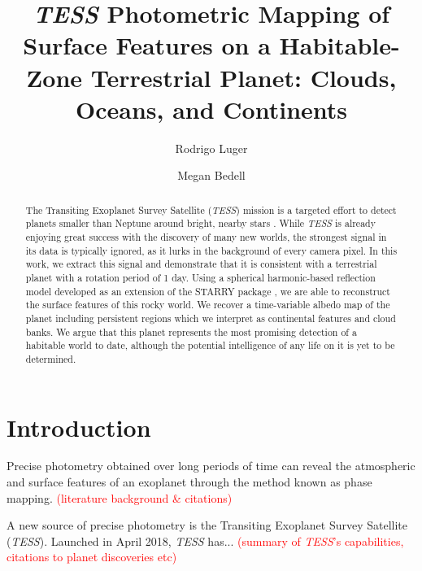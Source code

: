 \documentclass[modern]{aastex62}
\newcommand{\TESS}{\emph{TESS}\xspace}
\newcommand{\todo}[1]{\textcolor{red}{#1}}
\begin{document}
\title{\TESS Photometric Mapping of Surface Features on a Habitable-Zone Terrestrial Planet: Clouds, Oceans, and Continents}

\author[0000-0002-0296-3826]{Rodrigo Luger}
%
\author[0000-0002-9328-5652]{Megan Bedell}

\begin{abstract}
The Transiting Exoplanet Survey Satellite (\TESS) mission is a targeted effort to detect planets smaller than Neptune around bright, nearby stars \citep{Ricker2015}. 
While \TESS is already enjoying great success with the discovery of many new worlds, the strongest signal in its data is typically ignored, as it lurks in the background of every camera pixel. 
In this work, we extract this signal and demonstrate that it is consistent with a terrestrial planet with a rotation period of 1 day. 
Using a spherical harmonic-based reflection model developed as an extension of the STARRY package \citep{Luger2018}, we are able to reconstruct the surface features of this rocky world. 
We recover a time-variable albedo map of the planet including persistent regions which we interpret as continental features and cloud banks. 
We argue that this planet represents the most promising detection of a habitable world to date, although the potential intelligence of any life on it is yet to be determined.
\end{abstract}


\section{Introduction}
\label{sec:intro}

Precise photometry obtained over long periods of time can reveal the atmospheric and surface features of an exoplanet through the method known as phase mapping. \todo{(literature background \& citations)}

A new source of precise photometry is the Transiting Exoplanet Survey Satellite (\TESS). 
Launched in April 2018, \TESS has... \todo{(summary of \TESS's capabilities, citations to planet discoveries etc)}
\end{document}
